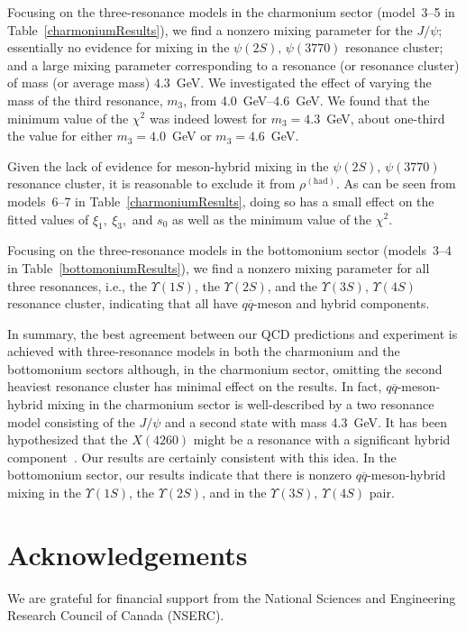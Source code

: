 \documentclass[11pt, letterpaper]{article}
\begin{document}
Focusing on the three-resonance models in the charmonium 
sector (model~3--5 in Table~\ref{charmoniumResults}), 
we find  a nonzero mixing parameter for the $J/\psi$; 
essentially no evidence for mixing in the $\psi(2S),\,\psi(3770)$ 
resonance cluster; and
a large mixing parameter corresponding to a resonance (or resonance
cluster) of mass (or average mass) $4.3$~GeV.
We investigated the effect of varying the mass of
the third resonance, $m_3$, from 4.0~GeV--4.6~GeV.
We found that the minimum value of the $\chi^2$ was indeed lowest for
$m_3=4.3$~GeV, about one-third the value for either $m_3=4.0$~GeV
or $m_3=4.6$~GeV.

Given the lack of evidence for meson-hybrid mixing in the $\psi(2S),\,\psi(3770)$ 
resonance cluster, it is reasonable to exclude it from $\rho^{(\text{had})}$. 
As can be seen from models~6--7 in Table~\ref{charmoniumResults}, doing so
has a small effect on the fitted values of $\xi_1,\ \xi_3,$ and $s_0$ 
as well as the minimum value of the $\chi^2$.

Focusing on the three-resonance models in the bottomonium 
sector (models~3--4 in Table~\ref{bottomoniumResults}), 
we find a nonzero mixing parameter for all three resonances, i.e., the
$\Upsilon(1S)$, the $\Upsilon(2S)$, and the $\Upsilon(3S),\,\Upsilon(4S)$ 
resonance cluster, indicating that all have $q\overline{q}$-meson and hybrid components.

In summary, the best agreement between our QCD predictions and experiment is achieved with
three-resonance models in both the charmonium and the bottomonium sectors
although, in the charmonium sector, omitting the second heaviest resonance cluster
has minimal effect on the results.
In fact, $q\overline{q}$-meson-hybrid mixing in the charmonium sector is well-described by a
two resonance model consisting of the $J/\psi$ and a second state with mass 
4.3~GeV.
It has been hypothesized that the $X(4260)$ might be a resonance with a significant hybrid 
component~\cite{ClosePage1995a,Kou:2005gt,Zhu:2005hp}.
Our results are certainly consistent with this idea.
In the bottomonium sector, our results indicate that there is nonzero $q\overline{q}$-meson-hybrid
mixing in the $\Upsilon(1S)$, the $\Upsilon(2S)$, 
and in the $\Upsilon(3S),\,\Upsilon(4S)$ pair.


\clearpage
\section*{Acknowledgements}
We are grateful for financial support from the National Sciences and 
Engineering Research Council of Canada (NSERC).



\end{document}
